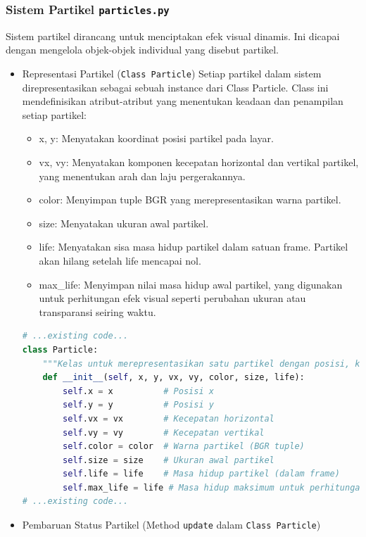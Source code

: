 \documentclass[11pt,a4paper]{article}
\begin{document}
\subsubsection{Sistem Partikel \texttt{particles.py}}
Sistem partikel dirancang untuk menciptakan efek visual dinamis. Ini dicapai dengan mengelola objek-objek individual yang disebut partikel.
\begin{itemize}
\item Representasi Partikel (\texttt{Class Particle})
\newline Setiap partikel dalam sistem direpresentasikan sebagai sebuah instance dari Class Particle. Class ini mendefinisikan atribut-atribut yang menentukan keadaan dan penampilan setiap partikel:
\begin{itemize}
\item x, y: Menyatakan koordinat posisi partikel pada layar.
\item vx, vy: Menyatakan komponen kecepatan horizontal dan vertikal partikel, yang menentukan arah dan laju pergerakannya.
\item color: Menyimpan tuple BGR yang merepresentasikan warna partikel.
\item size: Menyatakan ukuran awal partikel.
\item life: Menyatakan sisa masa hidup partikel dalam satuan frame. Partikel akan hilang setelah life mencapai nol.
\item max\_life: Menyimpan nilai masa hidup awal partikel, yang digunakan untuk perhitungan efek visual seperti perubahan ukuran atau transparansi seiring waktu.
\end{itemize}
\begin{lstlisting}[language=Python, caption=Class Particle]
# ...existing code...
class Particle:
    """Kelas untuk merepresentasikan satu partikel dengan posisi, kecepatan, warna, ukuran, dan masa hidup."""
    def __init__(self, x, y, vx, vy, color, size, life):
        self.x = x          # Posisi x
        self.y = y          # Posisi y
        self.vx = vx        # Kecepatan horizontal
        self.vy = vy        # Kecepatan vertikal
        self.color = color  # Warna partikel (BGR tuple)
        self.size = size    # Ukuran awal partikel
        self.life = life    # Masa hidup partikel (dalam frame)
        self.max_life = life # Masa hidup maksimum untuk perhitungan alpha
# ...existing code...
\end{lstlisting}
\item Pembaruan Status Partikel (Method \texttt{update} dalam \texttt{Class Particle})

\end{itemize}
\end{document}
